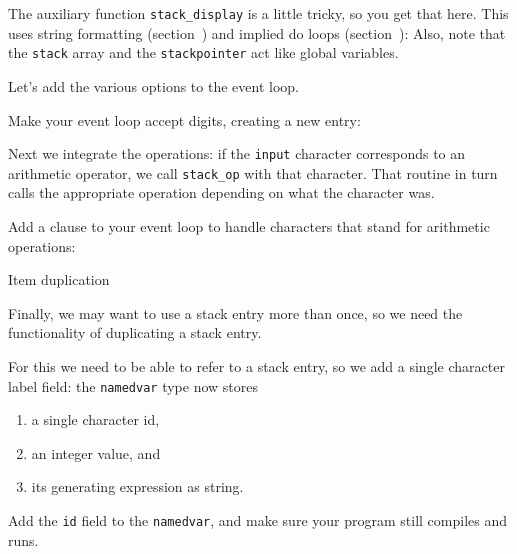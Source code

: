 The auxiliary function \lstinline{stack_display} is a little tricky,
so you get that here.
This uses string formatting (section~)
and implied do loops (section~):
Also, note that the \lstinline{stack} array and the \lstinline{stackpointer}
act like global variables.
%

Let's add the various options to the event loop.

\begin{exercise}
  \label{ex:f-var-loop-dig-name}
  Make your event loop accept digits, creating a new entry:
  \def\snippetcodefraction{.7}
  \def\snippetanswfraction{.9}
\end{exercise}

Next we integrate the operations:
if the \lstinline{input} character corresponds
to an arithmetic operator,
we call \lstinline{stack_op} with that character.
That routine in turn calls the appropriate operation
depending on what the character was.

\begin{exercise}
  \label{ex:f-var-loop-op}
  Add a clause to your event loop
  to handle characters that stand for arithmetic operations:
  \def\snippetcodefraction{.7}
  \def\snippetanswfraction{.9}
\end{exercise}

 {Item duplication}

Finally, we may want to use a stack entry more than once,
so we need the functionality of
duplicating a stack entry.

For this we need to be able to refer to a stack entry,
so we add a single character label field:
the \lstinline{namedvar} type now stores
\begin{enumerate}
\item a single character id,
\item an integer value, and
\item its generating expression as string.
\end{enumerate}
%

\begin{exercise}
  \label{ex:f-stack-extend-id}
  Add the \lstinline{id} field to the \lstinline{namedvar},
  and make sure your program still compiles and runs.
\end{exercise}

